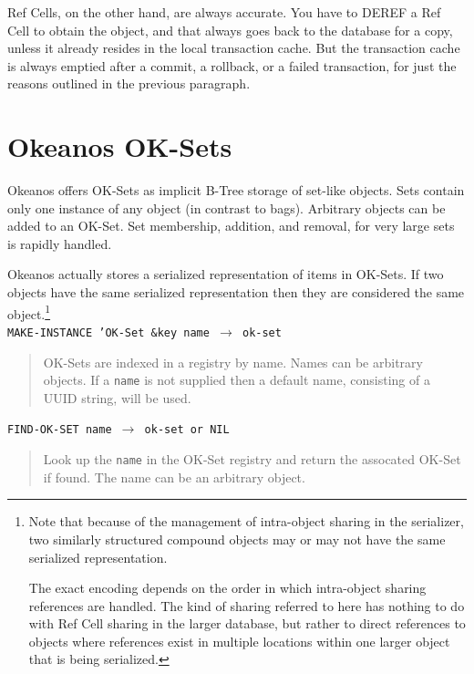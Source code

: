 \documentclass[article,oneside]{memoir}
\begin{document}
Ref Cells, on the other hand, are always accurate. You have to {\ttfamily DEREF} a Ref Cell to obtain the object, and that always goes back to the database for a copy, unless it already resides in the local transaction cache. But the transaction cache is always emptied after a commit, a rollback, or a failed transaction, for just the reasons outlined in the previous paragraph.

\newpage

\chapter{Okeanos OK-Sets}
Okeanos offers OK-Sets as implicit B-Tree storage of set-like objects. Sets contain only one instance of any object (in contrast to bags). Arbitrary objects can be added to an OK-Set. Set membership, addition, and removal, for very large sets is rapidly handled.

Okeanos actually stores a serialized representation of items in OK-Sets. If two objects have the same serialized representation then they are considered the same object.\footnote{Note that because of the management of intra-object sharing in the serializer, two similarly structured compound objects may or may not have the same serialized representation.

 The exact encoding depends on the order in which intra-object sharing references are handled. The kind of sharing referred to here has nothing to do with Ref Cell sharing in the larger database, but rather to direct references to objects where references exist in multiple locations within one larger object that is being serialized.}\\

\noindent \texttt{MAKE-INSTANCE 'OK-Set  \&key name $\rightarrow$ ok-set}

\begin{quote}
OK-Sets are indexed in a registry by name. Names can be arbitrary objects. If a \texttt{name} is not supplied then a default name, consisting of a UUID string, will be used.
\end{quote}

\noindent \texttt{FIND-OK-SET name $\rightarrow$ ok-set or NIL}

\begin{quote}
Look up the \texttt{name} in the OK-Set registry and return the assocated OK-Set if found. The name can be an arbitrary object.
\end{quote}
\end{document}
